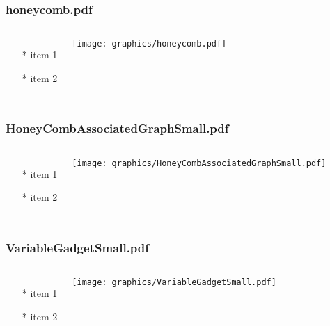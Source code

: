 \documentclass{beamer}
\begin{document}
\begin{frame} \frametitle{honeycomb.pdf}
    \begin{columns}[c]
        \begin{itemize}
            \item[*] item 1
            \item[*] item 2
        \end{itemize}
        \begin{minipage}{\linewidth}
            \begin{center}
            \texttt{[image: graphics/honeycomb.pdf]}
            \label{gfx:honeycomb.pdf}
            \end{center}
        \end{minipage}
    \end{columns}
\end{frame}

\begin{frame} \frametitle{HoneyCombAssociatedGraphSmall.pdf}
    \begin{columns}[c]
        \begin{itemize}
            \item[*] item 1
            \item[*] item 2
        \end{itemize}
        \begin{minipage}{\linewidth}
            \begin{center}
            \texttt{[image: graphics/HoneyCombAssociatedGraphSmall.pdf]}
            \label{gfx:HoneyCombAssociatedGraphSmall.pdf}
            \end{center}
        \end{minipage}
    \end{columns}
\end{frame}

\begin{frame} \frametitle{VariableGadgetSmall.pdf}
    \begin{columns}[c]
        \begin{itemize}
            \item[*] item 1
            \item[*] item 2
        \end{itemize}
        \begin{minipage}{\linewidth}
            \begin{center}
            \texttt{[image: graphics/VariableGadgetSmall.pdf]}
            \label{gfx:VariableGadgetSmall.pdf}
            \end{center}
        \end{minipage}
    \end{columns}
\end{frame}
\end{document}
